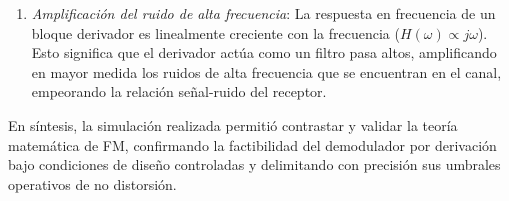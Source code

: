 \begin{itemize}
\begin{enumerate}
                    portadora se trasladará directamente a la señal demodulada. En la práctica, esto requiere colocar
                    una etapa limitadora de amplitud antes del derivador.
              \item \emph{Amplificación del ruido de alta frecuencia}: La respuesta en frecuencia de un bloque
                    derivador es linealmente creciente con la frecuencia ($H(\omega) \propto j\omega$). Esto significa
                    que el derivador actúa como un filtro pasa altos, amplificando en mayor medida los ruidos de alta
                    frecuencia que se encuentran en el canal, empeorando la relación señal-ruido del receptor.
          \end{enumerate}
\end{itemize}

En síntesis, la simulación realizada permitió contrastar y validar la teoría matemática de FM, confirmando la
factibilidad del demodulador por derivación bajo condiciones de diseño controladas y delimitando con precisión sus
umbrales operativos de no distorsión.
